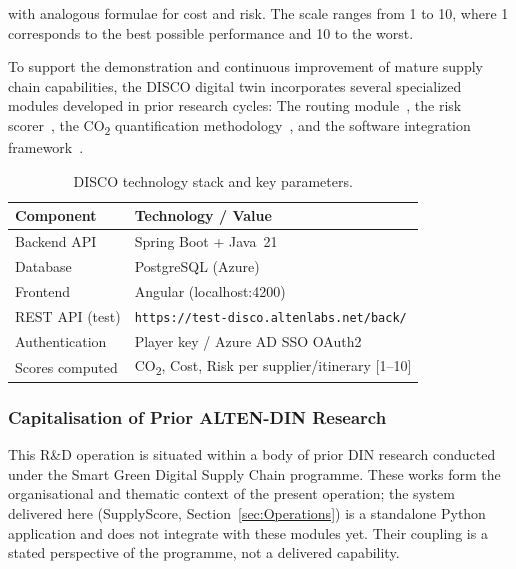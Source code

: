 with analogous formulae for cost and risk. The scale ranges from 1 to 10, where 1 corresponds to the best possible performance and 10 to the worst.

To support the demonstration and continuous improvement of mature supply chain capabilities, the DISCO digital twin incorporates several specialized modules developed in prior research cycles: The routing module~\autocite{baulain2024internet}, the risk scorer~\autocite{kabouche2025scoring}, the CO\textsubscript{2} quantification methodology~\autocite{cordova2024green}, and the software integration framework~\autocite{auclin2025bst}.


	\begin{table}[ht]
	\centering
	\caption{DISCO technology stack and key parameters.}
	\label{tab:disco_stack}
	\begin{tabularx}{\linewidth}{lX}
	\toprule
	\textbf{Component} & \textbf{Technology / Value} \\
	\midrule
	Backend API    & Spring Boot + Java~21 \\
	Database       & PostgreSQL (Azure) \\
	Frontend       & Angular (localhost:4200) \\
	REST API (test) & \texttt{https://test-disco.altenlabs.net/back/} \\
	Authentication & Player key / Azure AD SSO OAuth2 \\
	Scores computed & CO\textsubscript{2}, Cost, Risk per supplier/itinerary [1–10] \\
	\bottomrule
	\end{tabularx}
	\end{table}

\subsubsection{Capitalisation of Prior ALTEN-DIN Research}

This R\&D operation is situated within a body of prior DIN research conducted under
the Smart Green Digital Supply Chain programme. These works form the organisational and thematic context of the present
operation; the system delivered here (SupplyScore, Section~\ref{sec:Operations}) is
a standalone Python application and does not integrate with these modules yet.
Their coupling is a stated perspective of the programme, not a
delivered capability.

